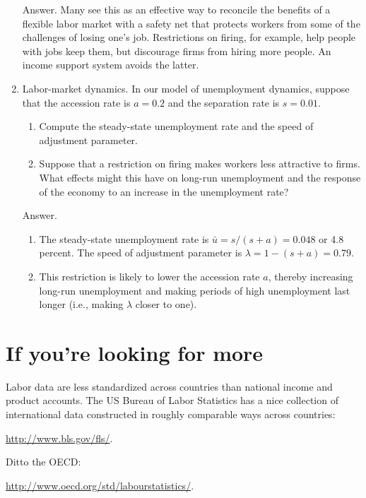 \begin{enumerate}
Answer.  Many see this as an effective way to
reconcile the benefits of a flexible labor market
with a safety net that protects workers from some
of the challenges of losing one's job.
Restrictions on firing, for example, help people with jobs keep them,
but discourage firms from hiring more people.
An income support system avoids the latter.


\item Labor-market dynamics.
In our model of unemployment dynamics, suppose that the accession rate is
$a = 0.2$ and the separation rate is $s = 0.01$.
\begin{enumerate}
\item Compute the steady-state unemployment rate and the speed
of adjustment parameter.
\item Suppose that a restriction on firing makes workers less attractive to firms.
What effects might this have on long-run unemployment
and the response of the economy to an increase in the unemployment rate?
\end{enumerate}

Answer.
\begin{enumerate}
\item The steady-state unemployment rate is $\bar{u} = s/(s+a) = 0.048$
or 4.8 percent.
The speed of adjustment parameter is $\lambda = 1-(s+a) = 0.79$.
\item This restriction is likely to lower the accession rate $a$,
thereby increasing long-run unemployment and making periods of high unemployment
last longer (i.e., making $\lambda$ closer to one).
\end{enumerate}
\end{enumerate}
\setlength{\leftmargini}{\oldleftmargini}

\section*{If you're looking for more}

Labor data are less standardized across countries than national
income and product accounts.
The US Bureau of Labor Statistics has a nice collection
of international data constructed in roughly comparable ways across countries:

\vspace*{\parskip}
\centerline{\url{http://www.bls.gov/fls/}.}

Ditto the {OECD}:

\vspace*{\parskip}
\centerline{\url{http://www.oecd.org/std/labourstatistics/}.}

